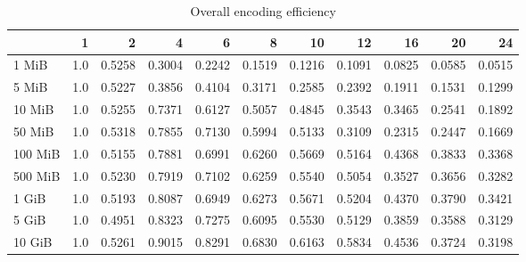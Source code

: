 \begin{table}[!h]
	\caption{Overall encoding efficiency}
	\begin{tabular}{lrrrrrrrrrr}
		\toprule
		{} &   1  &      2  &      4  &      6  &      8  &      10 &      12 &      16 &      20 &      24 \\
		\midrule
		1 MiB   &  1.0 &  0.5258 &  0.3004 &  0.2242 &  0.1519 &  0.1216 &  0.1091 &  0.0825 &  0.0585 &  0.0515 \\
		5 MiB   &  1.0 &  0.5227 &  0.3856 &  0.4104 &  0.3171 &  0.2585 &  0.2392 &  0.1911 &  0.1531 &  0.1299 \\
		10 MiB  &  1.0 &  0.5255 &  0.7371 &  0.6127 &  0.5057 &  0.4845 &  0.3543 &  0.3465 &  0.2541 &  0.1892 \\
		50 MiB  &  1.0 &  0.5318 &  0.7855 &  0.7130 &  0.5994 &  0.5133 &  0.3109 &  0.2315 &  0.2447 &  0.1669 \\
		100 MiB &  1.0 &  0.5155 &  0.7881 &  0.6991 &  0.6260 &  0.5669 &  0.5164 &  0.4368 &  0.3833 &  0.3368 \\
		500 MiB &  1.0 &  0.5230 &  0.7919 &  0.7102 &  0.6259 &  0.5540 &  0.5054 &  0.3527 &  0.3656 &  0.3282 \\
		1 GiB   &  1.0 &  0.5193 &  0.8087 &  0.6949 &  0.6273 &  0.5671 &  0.5204 &  0.4370 &  0.3790 &  0.3421 \\
		5 GiB   &  1.0 &  0.4951 &  0.8323 &  0.7275 &  0.6095 &  0.5530 &  0.5129 &  0.3859 &  0.3588 &  0.3129 \\
		10 GiB  &  1.0 &  0.5261 &  0.9015 &  0.8291 &  0.6830 &  0.6163 &  0.5834 &  0.4536 &  0.3724 &  0.3198 \\
		\bottomrule
	\end{tabular}
\end{table}
